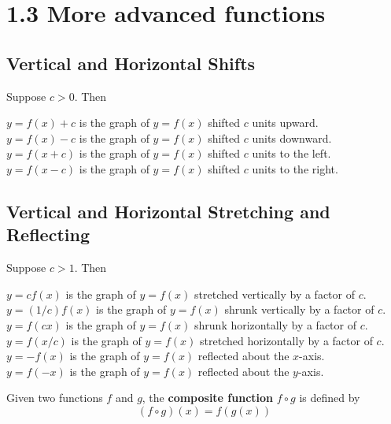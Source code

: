 %
%

\section*{1.3 More advanced functions}

\subsection*{Vertical and Horizontal Shifts}

Suppose \(c>0\). Then
\begin{center}
\(y=f(x)+c\) is the graph of \(y=f(x)\) shifted \(c\) units upward.\\
\(y=f(x)-c\) is the graph of \(y=f(x)\) shifted \(c\) units downward.\\
\(y=f(x+c)\) is the graph of \(y=f(x)\) shifted \(c\) units to the left.\\
\(y=f(x-c)\) is the graph of \(y=f(x)\) shifted \(c\) units to the right.\\
\end{center}

\subsection*{Vertical and Horizontal Stretching and Reflecting}

Suppose \(c>1\). Then
\begin{center}
\(y=cf(x)\) is the graph of \(y=f(x)\) stretched vertically by a factor of \(c\).\\
\(y=(1/c)f(x)\) is the graph of \(y=f(x)\) shrunk vertically by a factor of \(c\).\\
\(y=f(cx)\) is the graph of \(y=f(x)\) shrunk horizontally by a factor of \(c\).\\
\(y=f(x/c)\) is the graph of \(y=f(x)\) stretched horizontally by a factor of \(c\).\\
\(y=-f(x)\) is the graph of \(y=f(x)\) reflected about the \(x\)-axis.\\
\(y=f(-x)\) is the graph of \(y=f(x)\) reflected about the \(y\)-axis.
\end{center}
Given two functions \(f\) and \(g\), the \textbf{composite function} \(f \circ g\) is defined by 
$$(f \circ g)(x)=f(g(x))$$
